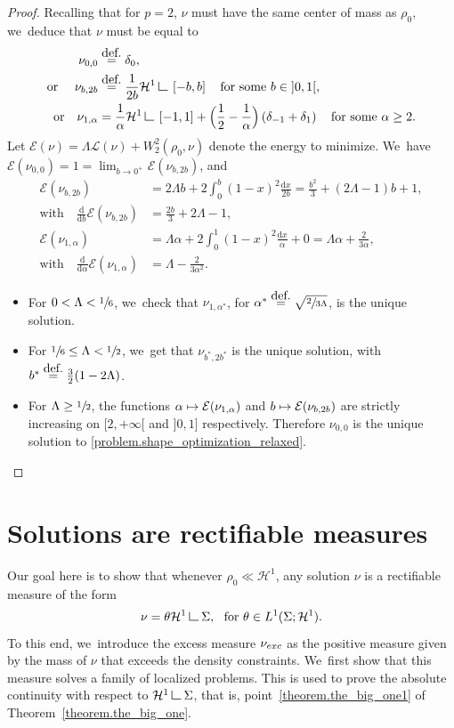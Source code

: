 \documentclass[11pt]{article}
\numberwithin{equation}{section}
\newcommand\mto{\mathchoice{\longmapsto}{\mapsto}{\mapsto}{\mapsto}}
\theoremstyle{definition}
\newcommand{\eqdef}{\ensuremath{\stackrel{\mbox{\upshape\tiny def.}}{=}}}
\newcommand\LM[1]{\hbox{\vrule width.5pt \vbox to#1pt{\vfill \hrule width#1pt height.5pt}}}
\newcommand\LL{{\mathchoice {\>\LM7\>}{\>\LM7\>}{\,\LM5\,}{\,\LM{3.35}\,}}}
\newcommand{\mres}{\LL}
\newcommand\E{\mathcal{E}}
\newcommand\cH{\mathcal{H}}
\newcommand\cL{\mathcal{L}}
\newcommand{\nuexc}{\nu_{\textup{exc}}}
\newcommand\dd{\mathrm{d}}
\newcommand{\oi}[2]{ \left] #1, #2 \right[ }
\newcommand{\ci}[2]{ \left[ #1, #2 \right] }
\begin{document}
\begin{proof}
Recalling that for $p=2$, $\nu$ must have the same center of mass as $\rho_0$, we~deduce that $\nu$ must be equal to
\begin{align*}
\nu_{0,0} &\eqdef\delta_0,\\
\mbox{or }\quad
\nu_{b,2b}&\eqdef \frac{1}{2b}\cH^1\mres\ci{-b}{b}\quad\mbox{for some $b \in \oi{0}{1}$},\\
\mbox{or}\quad \nu_{1,\alpha} &= \frac{1}{\alpha}\cH^1\mres\ci{-1}{1} + \Bigl(\frac{1}{2}-\frac{1}{\alpha}\Bigr)\left(\delta_{-1}+\delta_{1}\right)\quad \mbox{for some $\alpha\geq 2$.}
\end{align*}
Let $\E(\nu)= \Lambda \cL(\nu)+W_2^2(\rho_0,\nu)$ denote the energy to minimize. We~have $\E(\nu_{0,0})=1 = \lim_{b \to 0^+} \E(\nu_{b,2b})$, and
\begin{align*}
\E(\nu_{b,2b})&= 2\Lambda b + 2 \int_0^b (1-x)^2\frac{\dd x}{2b} = \frac{b^2}{3}+ (2\Lambda-1)b+1,\\
\mbox{with}\quad \frac{\dd}{\dd b}\E(\nu_{b,2b}) &= \frac{2b}{3}+2\Lambda-1,\\
\E(\nu_{1,\alpha})&= \Lambda \alpha + 2\int_0^1(1-x)^2\frac{\dd x}{\alpha}+0 = \Lambda \alpha +\frac{2}{3\alpha},\\
\mbox{with}\quad \frac{\dd}{\dd \alpha}\E(\nu_{1,\alpha}) &= \Lambda - \frac{2}{3\alpha^2}.
\end{align*}

\begin{itemize}
\item
For $0<\Lambda<\sfrac{1}{6}$, we~check that $\nu_{1,\alpha^*}$, for $\alpha^*\eqdef \sqrt{\sfrac{2}{3\Lambda}}$, is the unique solution.

\item
For $\sfrac{1}{6}\le \Lambda < \sfrac{1}{2}$, we~get that $\nu_{b^*,2b^*}$ is the unique solution, with $b^*\eqdef \frac{3}{2}(1-2\Lambda)$.

\item
For $\Lambda \geq \sfrac{1}{2}$, the functions $\alpha\mto \E(\nu_{1,\alpha})$ and $b\mto \E(\nu_{b,2b})$ are strictly increasing on $[2,+\infty[$ and $]0,1]$ respectively. Therefore $\nu_{0,0}$ is the unique solution to \eqref{problem.shape_optimization_relaxed}.\qedhere
\end{itemize}
\end{proof}

\section{Solutions are rectifiable measures}\label{section.solutions_are_absolutely_continuous}
Our goal here is to show that whenever $\rho_0 \ll \cH^1$, any solution $\nu$ is a rectifiable measure
of the form
\[
\nu = \theta \cH^1\mres \Sigma, \ \text{ for $\theta \in L^1(\Sigma; \cH^1)$}.
\]
To this end, we~introduce the excess measure $\nuexc$ as the positive measure given by the mass of $\nu$ that exceeds the density constraints. We~first show that this measure solves a family of localized problems. This is used to prove the absolute continuity with respect to $\cH^1\mres\Sigma$, that is, point~\eqref{theorem.the_big_one1} of Theorem~\ref{theorem.the_big_one}.
\end{document}
